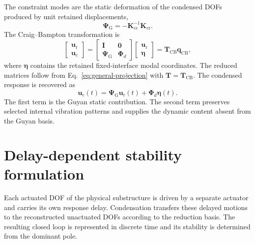 \documentclass[11pt]{article}
\newenvironment{revision}{\begingroup\color{red}}{\endgroup}
\begin{document}
The constraint modes are the static deformation of the condensed DOFs produced by unit retained displacements,
\begin{equation}
    \bm{\Psi}_{\mathrm{G}}=-\mathbf{K}_{\mathrm{cc}}^{-1}\mathbf{K}_{\mathrm{cr}}.
    \label{eq:constraint-modes}
\end{equation}
The Craig--Bampton transformation is
\begin{equation}
\begin{bmatrix}
\bm{u}_{\mathrm{r}}\\
\bm{u}_{\mathrm{c}}
\end{bmatrix}
=
\begin{bmatrix}
\mathbf{I} & \mathbf{0}\\
\bm{\Psi}_{\mathrm{G}} & \bm{\Phi}_{d}
\end{bmatrix}
\begin{bmatrix}
\bm{u}_{\mathrm{r}}\\
\bm{\eta}
\end{bmatrix}
=\mathbf{T}_{\mathrm{CB}}\bm{q}_{\mathrm{CB}},
\label{eq:cb-transformation}
\end{equation}
where \(\bm{\eta}\) contains the retained fixed-interface modal coordinates. The reduced matrices follow from Eq.~\eqref{eq:general-projection} with \(\mathbf{T}=\mathbf{T}_{\mathrm{CB}}\). The condensed response is recovered as
\begin{equation}
    \bm{u}_{\mathrm{c}}(t)
    =\bm{\Psi}_{\mathrm{G}}\bm{u}_{\mathrm{r}}(t)
    +\bm{\Phi}_{d}\bm{\eta}(t).
    \label{eq:cb-internal-recovery}
\end{equation}
\begin{revision}
The first term is the Guyan static contribution. The second term preserves selected internal vibration patterns and supplies the dynamic content absent from the Guyan basis.
\end{revision}

\section{Delay-dependent stability formulation}\label{sec:stability}

\begin{revision}
Each actuated DOF of the physical substructure is driven by a separate actuator and carries its own response delay. Condensation transfers these delayed motions to the reconstructed unactuated DOFs according to the reduction basis. The resulting closed loop is represented in discrete time and its stability is determined from the dominant pole.
\end{revision}
\end{document}
